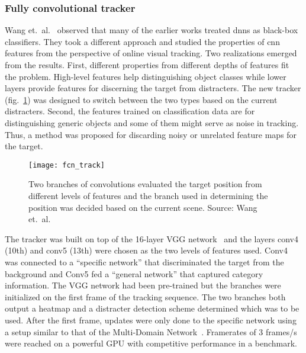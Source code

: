 \subsubsection{Fully convolutional tracker}
Wang et.~al.~\cite{FCN_TRACK_2} observed that many of the earlier works treated \ac{dnn}s
as black-box classifiers. They took a different approach and studied the properties of
\ac{cnn} features from the perspective of online visual tracking. Two realizations
emerged from the results. First, different properties from different depths of features
fit the problem. High-level features help distinguishing object classes while lower
layers provide features for discerning the target from distracters. The new tracker
(fig.~\ref{fig:fcn}) was designed to switch between the two types based on the current
distracters. Second, the features trained on classification data are for distinguishing
generic objects and some of them might serve as noise in tracking. Thus, a method was
proposed for discarding noisy or unrelated feature maps for the target.~\cite{FCN_TRACK_2}

\begin{figure}[H]
\centering
\texttt{[image: fcn\_track]}
\caption{Two branches of convolutions evaluated the target position from different
         levels of features and the branch used in determining the position was decided
         based on the current scene. Source: Wang et.~al.~\cite{FCN_TRACK_2}}\label{fig:fcn}
\end{figure}

The tracker was built on top of the 16-layer VGG network~\cite{VGG} and the layers
conv4 (10th) and conv5 (13th) were chosen as the two
levels of features used. Conv4 was connected to a ``specific network''
that discriminated the target from the background and Conv5 fed a
``general network'' that captured category information. The VGG network had been
pre-trained but the branches were initialized on the first frame of the tracking
sequence. The two branches both output a heatmap and a distracter detection scheme
determined which was to be used. After the first frame, updates were only done to
the specific network using a setup similar to that of the Multi-Domain Network~\cite{MDNET}.
Framerates of 3 frames/s were reached on a powerful GPU with competitive performance in
a benchmark.~\cite{FCN_TRACK_2}

